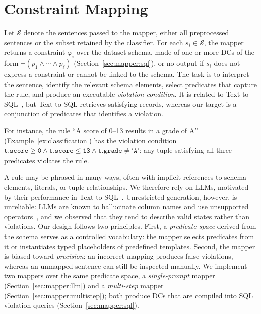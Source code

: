 \section{Constraint Mapping}
\label{sec:mapper}

Let $\mathcal{S}$ denote the sentences passed to the mapper, either all preprocessed sentences or the subset retained by the classifier. For each $s_i \in \mathcal{S}$, the mapper returns a constraint $\varphi_i$ over the dataset schema, made of one or more DCs of the form $\neg(p_1 \land \cdots \land p_\ell)$ (Section~\ref{sec:mapper:sql}), or no output if $s_i$ does not express a constraint or cannot be linked to the schema. The task is to interpret the sentence, identify the relevant schema elements, select predicates that capture the rule, and produce an executable \emph{violation condition}. It is related to Text-to-SQL~\cite{yu2018spider}, but Text-to-SQL retrieves satisfying records, whereas our target is a conjunction of predicates that identifies a violation.

For instance, the rule ``A score of 0--13 results in a grade of A'' (Example~\ref{ex:classification}) has the violation condition
$\texttt{t.score} \geq \texttt{0} \land \texttt{t.score} \leq \texttt{13} \land \texttt{t.grade} \neq \texttt{`A'}$: any tuple satisfying all three predicates violates the rule.

A rule may be phrased in many ways, often with implicit references to schema elements, literals, or tuple relationships. We therefore rely on LLMs, motivated by their performance in Text-to-SQL~\cite{llmTEXT2SQLSurvey2025}. Unrestricted generation, however, is unreliable: LLMs are known to hallucinate column names and use unsupported operators~\cite{dail2025,llmTEXT2SQLSurvey2025,DBLP:conf/dexa/DociniAO25}, and we observed that they tend to describe valid states rather than violations. Our design follows two principles. First, a \emph{predicate space} derived from the schema serves as a controlled vocabulary: the mapper selects predicates from it or instantiates typed placeholders of predefined templates. Second, the mapper is biased toward \emph{precision}: an incorrect mapping produces false violations, whereas an unmapped sentence can still be inspected manually. We implement two mappers over the same predicate space, a \emph{single-prompt} mapper (Section~\ref{sec:mapper:llm}) and a \emph{multi-step} mapper (Section~\ref{sec:mapper:multistep}); both produce DCs that are compiled into SQL violation queries (Section~\ref{sec:mapper:sql}).

